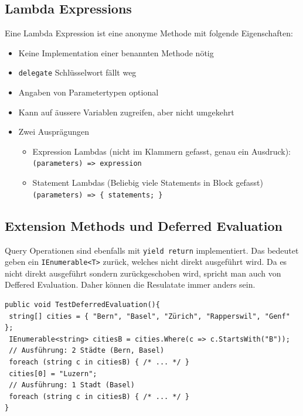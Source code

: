 \documentclass[
a4paper,
oneside,
10pt,
fleqn,
headsepline,
toc=listofnumbered, 
bibliography=totocnumbered]{scrartcl}
\begin{document}
\subsection{Lambda Expressions}
Eine Lambda Expression ist eine anonyme Methode mit folgende Eigenschaften:
\begin{itemize}
    \item Keine Implementation einer benannten Methode nötig
    \item \lstinline|delegate| Schlüsselwort fällt weg
    \item Angaben von Parametertypen optional
    \item Kann auf äussere Variablen zugreifen, aber nicht umgekehrt
    \item Zwei Ausprägungen
    \begin{itemize}
        \item Expression Lambdas (nicht im Klammern gefasst, genau ein Ausdruck): \lstinline|(parameters) => expression|
        \item Statement Lambdas (Beliebig viele Statements in Block gefasst) \lstinline|(parameters) => { statements; }|
    \end{itemize}
\end{itemize}

\subsection{Extension Methods und Deferred Evaluation}
Query Operationen sind ebenfalls mit \lstinline|yield return| implementiert. Das bedeutet geben ein \lstinline|IEnumerable<T>| zurück, welches nicht direkt ausgeführt wird. Da es nicht direkt ausgeführt sondern zurückgeschoben wird, spricht man auch von Deffered Evaluation. Daher können die Resulatate immer anders sein.

\begin{lstlisting}
public void TestDeferredEvaluation(){
 string[] cities = { "Bern", "Basel", "Zürich", "Rapperswil", "Genf" };
 IEnumerable<string> citiesB = cities.Where(c => c.StartsWith("B"));
 // Ausführung: 2 Städte (Bern, Basel)
 foreach (string c in citiesB) { /* ... */ } 
 cities[0] = "Luzern"; 
 // Ausführung: 1 Stadt (Basel)
 foreach (string c in citiesB) { /* ... */ }
} 
\end{lstlisting}
\end{document}
